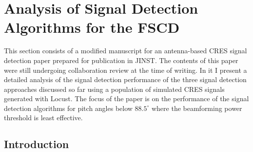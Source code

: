 \section{Analysis of Signal Detection Algorithms for the FSCD}
\label{sec:chap4-trigger-paper}
This section consists of a modified manuscript for an antenna-based CRES signal detection paper prepared for publication in JINST. The contents of this paper were still undergoing collaboration review at the time of writing. In it I present a detailed analysis of the signal detection performance of the three signal detection approaches discussed so far using a population of simulated CRES signals generated with Locust. The focus of the paper is on the performance of the signal detection algorithms for pitch angles below $88.5^\circ$ where the beamforming power threshold is least effective. 

\subsection{Introduction}
\label{sec:intro}


